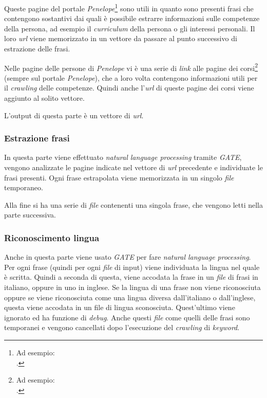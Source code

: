 \documentclass[tesi.tex]{subfiles}
\begin{document}
    Queste pagine del
    portale \emph{Penelope}\footnote{Ad esempio:\\
      .}
    sono utili in quanto sono presenti frasi che contengono sostantivi
    dai quali \`e possibile estrarre
    informazioni sulle competenze della persona, ad esempio il
    \emph{curriculum} della persona o gli interessi personali. Il loro
    \emph{url} viene memorizzato in un vettore da
    passare al punto successivo di estrazione delle frasi.

    Nelle pagine delle
    persone di \emph{Penelope} vi \`e una serie di \emph{link} alle pagine
    dei corsi\footnote{Ad esempio:\\
      .}
    (sempre sul portale \emph{Penelope}), che a loro volta
    contengono informazioni utili per il \emph{crawling} delle
    competenze. Quindi anche l'\emph{url} di queste pagine dei corsi
    viene aggiunto al solito vettore.

    L'output di questa parte \`e un vettore
    di \emph{url}.
\subsubsection{Estrazione frasi}
 In questa parte viene effettuato \emph{natural language
      processing} tramite \emph{GATE}, vengono analizzate le pagine indicate
    nel vettore di \emph{url} precedente e individuate le
    frasi presenti. Ogni frase estrapolata viene memorizzata in un
    singolo \emph{file} temporaneo.

    Alla fine si ha una serie di \emph{file} contenenti una
    singola frase, che vengono letti nella parte successiva.
\subsubsection{Riconoscimento lingua}
 Anche in questa parte viene usato \emph{GATE} per
    fare \emph{natural language processing}. Per
    ogni frase (quindi per ogni \emph{file} di input) viene
    individuata la lingua nel quale \`e scritta. Quindi a seconda di
    questa, viene accodata la frase in un \emph{file} di frasi in
    italiano, oppure in uno in inglese. Se la lingua di una frase non
    viene riconosciuta oppure se viene riconosciuta come una lingua
    diversa dall'italiano o dall'inglese, questa viene accodata in un file di lingua
    sconosciuta. Quest'ultimo viene ignorato ed ha funzione di \emph{debug}. Anche
    questi \emph{file} come quelli delle frasi sono temporanei e
    vengono cancellati dopo l'esecuzione del \emph{crawling} di
    \emph{keyword}.
\end{document}
